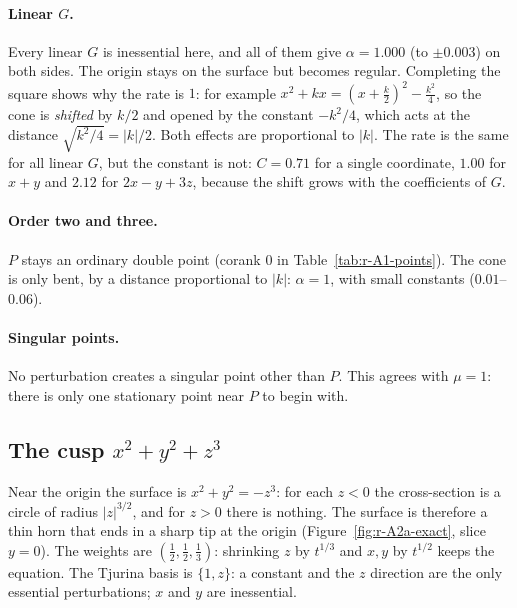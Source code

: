 \documentclass[12pt, a4paper]{article}
\theoremstyle{plain}
\theoremstyle{definition}
\theoremstyle{remark}
\theoremstyle{definition}
\begin{document}
\paragraph{Linear $G$.} Every linear $G$ is inessential here, and all of them give
$\alpha=1.000$ (to $\pm0.003$) on both sides. The origin stays on the surface but
becomes regular. Completing the square shows why the rate is $1$: for example
$x^2+kx=(x+\tfrac k2)^2-\tfrac{k^2}{4}$, so the cone is \emph{shifted} by $k/2$ and
opened by the constant $-k^2/4$, which acts at the distance $\sqrt{k^2/4}=|k|/2$.
Both effects are proportional to $|k|$. The rate is the same for all linear $G$,
but the constant is not: $C=0.71$ for a single coordinate, $1.00$ for $x+y$ and
$2.12$ for $2x-y+3z$, because the shift grows with the coefficients of $G$.

\paragraph{Order two and three.} $P$ stays an ordinary double point (corank $0$ in
Table~\ref{tab:r-A1-points}). The cone is only bent, by a distance proportional to
$|k|$: $\alpha=1$, with small constants ($0.01$--$0.06$).

\paragraph{Singular points.} No perturbation creates a singular point other than
$P$. This agrees with $\mu=1$: there is only one stationary point near $P$ to begin
with.
\clearpage

\subsection{The cusp $x^2+y^2+z^3$}
\label{sec:r-A2a}

Near the origin the surface is $x^2+y^2=-z^3$: for each $z<0$ the
cross-section is a circle of radius $|z|^{3/2}$, and for $z>0$ there is nothing.
The surface is therefore a thin horn that ends in a sharp tip at the origin
(Figure~\ref{fig:r-A2a-exact}, slice $y=0$). The weights are
$(\tfrac12,\tfrac12,\tfrac13)$: shrinking $z$ by $t^{1/3}$ and $x,y$ by $t^{1/2}$
keeps the equation. The Tjurina basis is $\{1,z\}$: a constant and the $z$
direction are the only essential perturbations; $x$ and $y$ are inessential.
\end{document}
